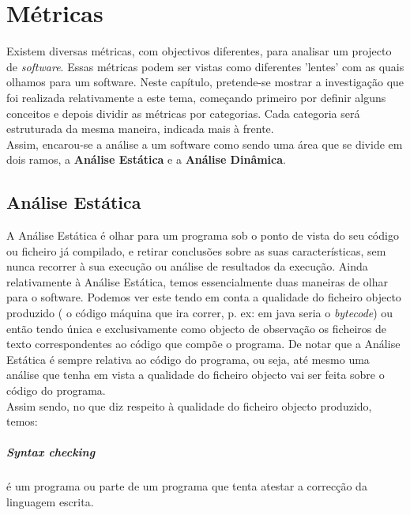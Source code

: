 \chapter{Métricas}\label{chap:metricas}
\minitoc

Existem diversas métricas, com objectivos diferentes, para analisar um projecto de \emph{software}. Essas métricas podem ser vistas como diferentes 'lentes' com as quais olhamos para um software. 
Neste capítulo, pretende-se mostrar a investigação que foi realizada relativamente a este tema, começando primeiro por definir alguns conceitos e depois dividir as métricas 
por categorias. Cada categoria será estruturada da mesma maneira, indicada mais à frente.\\

Assim, encarou-se a análise a um software como sendo uma área que se divide em dois ramos, a \textbf{Análise Estática} e a \textbf{Análise Dinâmica}.\\
\section{Análise Estática}
A Análise Estática é olhar para um programa sob o ponto de vista do seu código ou ficheiro já compilado, e retirar conclusões sobre as suas características, 
sem nunca recorrer à sua execução ou análise de resultados da execução.
Ainda relativamente à Análise Estática, temos essencialmente duas maneiras de olhar para o software. Podemos ver este tendo em conta a qualidade do ficheiro objecto 
produzido ( o código máquina que ira correr, p. ex: em java seria o \emph{bytecode}) ou então tendo única e exclusivamente como objecto de observação os ficheiros de 
texto correspondentes ao código que compõe o programa.
De notar que a Análise Estática é sempre relativa ao código do programa, ou seja, até mesmo uma análise que tenha em vista a qualidade do ficheiro objecto vai 
ser feita sobre o código do programa.\\

Assim sendo, no que diz respeito à qualidade do ficheiro objecto produzido, temos:

\paragraph{Syntax checking} é um programa ou parte de um programa que tenta atestar a correcção da linguagem escrita.

